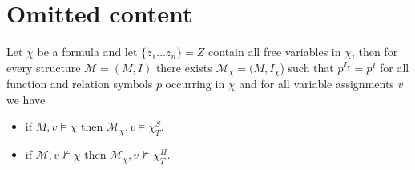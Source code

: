\documentclass[a4paper,UKenglish,cleveref, autoref, thm-restate]{lipics-v2021}
\begin{document}


\appendix

\section{Omitted content}

\begin{lemma}\label{ap1}
Let $\chi$ be a formula and let $\{z_1\dots z_n\} = Z$ contain all free variables in $\chi$, then for every structure $\mathcal M = (M, I)$ there exists $\mathcal M_\chi = (M, I_\chi$) such that $p^{I_{\chi}} = p^I$ for all function and relation symbols $p$ occurring in $\chi$ and for all variable assignments $v$ we have
	\begin{itemize}
		\item if $M, v \models\chi$ then $\mathcal M_\chi, v\models\chi^S_T$.
		\item if $\mathcal M, v\not\models\chi$ then $\mathcal M_\chi, v\not\models\chi^H_T$.
	\end{itemize}
\end{lemma}
\end{document}
